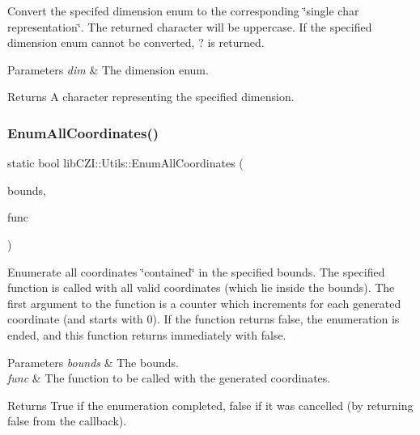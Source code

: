 Convert the specifed dimension enum to the corresponding \char`\"{}single char representation\char`\"{}. The returned character will be uppercase. If the specified dimension enum cannot be converted, \textquotesingle{}?\textquotesingle{} is returned.


\begin{DoxyParams}{Parameters}
{\em dim} & The dimension enum.\\
\hline
\end{DoxyParams}
\begin{DoxyReturn}{Returns}
A character representing the specified dimension. 
\end{DoxyReturn}
\mbox{\label{classlib_c_z_i_1_1_utils_a38d50d87b67917004a2f0c8156ecee6d}} 
\subsubsection{\texorpdfstring{Enum\+All\+Coordinates()}{EnumAllCoordinates()}}
{\footnotesize\ttfamily static bool lib\+C\+Z\+I\+::\+Utils\+::\+Enum\+All\+Coordinates (\begin{DoxyParamCaption}\item[{const \hyperlink{classlib_c_z_i_1_1_c_dim_bounds}{lib\+C\+Z\+I\+::\+C\+Dim\+Bounds} \&}]{bounds,  }\item[{const std\+::function$<$ bool(std\+::uint64\+\_\+t, const \hyperlink{classlib_c_z_i_1_1_c_dim_coordinate}{lib\+C\+Z\+I\+::\+C\+Dim\+Coordinate} \&coord)$>$ \&}]{func }\end{DoxyParamCaption})\hspace{0.3cm}{\ttfamily [static]}}

Enumerate all coordinates \char`\"{}contained\char`\"{} in the specified bounds. The specified function is called with all valid coordinates (which lie inside the bounds). The first argument to the function is a counter which increments for each generated coordinate (and starts with 0). If the function returns false, the enumeration is ended, and this function returns immediately with false.


\begin{DoxyParams}{Parameters}
{\em bounds} & The bounds. \\
\hline
{\em func} & The function to be called with the generated coordinates.\\
\hline
\end{DoxyParams}
\begin{DoxyReturn}{Returns}
True if the enumeration completed, false if it was cancelled (by returning false from the callback). 
\end{DoxyReturn}
\mbox{\label{classlib_c_z_i_1_1_utils_a95ff03d97620e252f08a8366fdead551}} 
